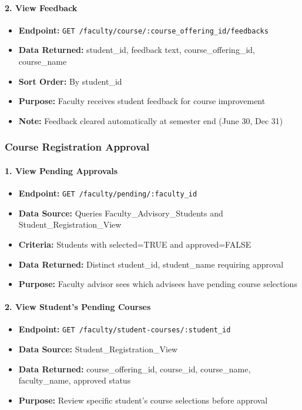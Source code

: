 \documentclass[12pt]{article}
\begin{document}
\paragraph{2. View Feedback}
\begin{itemize}
    \item \textbf{Endpoint:} \texttt{GET /faculty/course/:course\_offering\_id/feedbacks}
    \item \textbf{Data Returned:} student\_id, feedback text, course\_offering\_id, course\_name
    \item \textbf{Sort Order:} By student\_id
    \item \textbf{Purpose:} Faculty receives student feedback for course improvement
    \item \textbf{Note:} Feedback cleared automatically at semester end (June 30, Dec 31)
\end{itemize}

\subsubsection{Course Registration Approval}

\paragraph{1. View Pending Approvals}
\begin{itemize}
    \item \textbf{Endpoint:} \texttt{GET /faculty/pending/:faculty\_id}
    \item \textbf{Data Source:} Queries Faculty\_Advisory\_Students and Student\_Registration\_View
    \item \textbf{Criteria:} Students with selected=TRUE and approved=FALSE
    \item \textbf{Data Returned:} Distinct student\_id, student\_name requiring approval
    \item \textbf{Purpose:} Faculty advisor sees which advisees have pending course selections
\end{itemize}

\paragraph{2. View Student's Pending Courses}
\begin{itemize}
    \item \textbf{Endpoint:} \texttt{GET /faculty/student-courses/:student\_id}
    \item \textbf{Data Source:} Student\_Registration\_View
    \item \textbf{Data Returned:} course\_offering\_id, course\_id, course\_name, faculty\_name, approved status
    \item \textbf{Purpose:} Review specific student's course selections before approval
\end{itemize}
\end{document}
